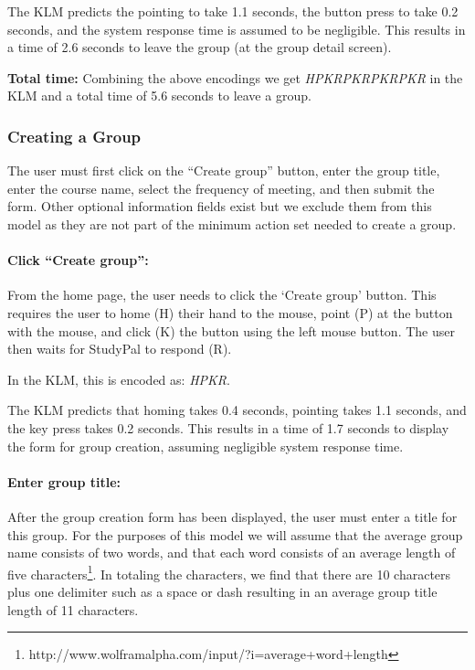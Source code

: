 \documentclass[conference]{IEEEtran}
\begin{document}
The KLM predicts the pointing to take 1.1 seconds, the button press to take 0.2 seconds, and the system response time is assumed to be negligible.
This results in a time of 2.6 seconds to leave the group (at the group detail screen).


\textbf{Total time:}
Combining the above encodings we get \emph{HPKRPKRPKRPKR} in the KLM and a total time of 5.6 seconds to leave a group.


\subsubsection{Creating a Group}
The user must first click on the ``Create group'' button, enter the group title, enter the course name, select the frequency of meeting, and then submit the form.
Other optional information fields exist but we exclude them from this model as they are not part of the minimum action set needed to create a group.

\paragraph{Click ``Create group'':}
From the home page, the user needs to click the `Create group' button.
This requires the user to home (H) their hand to the mouse, point (P) at the button with the mouse, and click (K) the button using the left mouse button.
The user then waits for StudyPal to respond (R).

In the KLM, this is encoded as: \emph{HPKR}.

The KLM predicts that homing takes 0.4 seconds, pointing takes 1.1 seconds, and the key press takes 0.2 seconds.
This results in a time of 1.7 seconds to display the form for group creation, assuming negligible system response time.

\paragraph{Enter group title:}
After the group creation form has been displayed, the user must enter a title for this group.
For the purposes of this model we will assume that the average group name consists of two words, and that each word consists of an average length of five characters\footnote{http://www.wolframalpha.com/input/?i=average+word+length}.
In totaling the characters, we find that there are 10 characters plus one delimiter such as a space or dash resulting in an average group title length of 11 characters.
\end{document}
